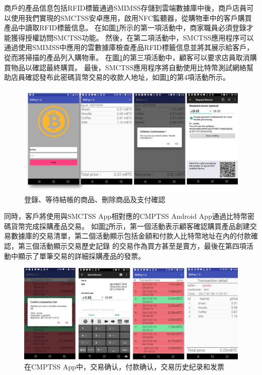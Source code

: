 商戶的產品信息包括RFID標籤通過SMIMSS存儲到雲端數據庫中後，商戶店員可以使用我們實現的SMCTSS安卓應用，啟用NFC監聽器，從購物車中的客戶購買產品中讀取RFID標籤信息。 在如圖\ref{fig7}所示的第一項活動中，商家職員必須登錄才能獲得授權訪問SMCTSS功能。 然後，在第二項活動中，SMCTSS應用程序可以通過使用SMIMSS中應用的雲數據庫檢查產品RFID標籤信息並將其展示給客戶，從而將掃描的產品列入購物車。 在圖\ref{fig7}的第三項活動中，顧客可以要求店員取消購買物品以確認最終購買。 最後，SMCTSS應用程序將自動使用比特幣測試網絡幫助店員確認發布此密碼貨幣交易的收款人地址，如圖\ref{fig7}的第4項活動所示。    
\begin{figure}[h]
	\centering
	\includegraphics[width = 1\textwidth]{fig7.png}
	\caption{登錄、等待結帳的商品、刪除商品及支付確認}\label{fig7}
\end{figure}
同時，客戶將使用與SMCTSS App相對應的CMPTSS Android App通過比特幣密碼貨幣完成採購產品交易。 如圖\ref{fig8}所示，第一個活動表示顧客確認購買產品創建交易數據庫的交易清單，第二個活動顯示包括金額和付款人比特幣地址在內的付款確認，第三個活動顯示交易歷史記錄 的交易作為買方甚至是賣方，最後在第四項活動中顯示了單筆交易的詳細採購產品的發票。    
\begin{figure}[h]
	\centering
	\includegraphics[width = 1\textwidth]{fig8.png}
	\caption{在CMPTSS App中，交易确认，付款确认，交易历史纪录和发票}\label{fig8}
\end{figure}


